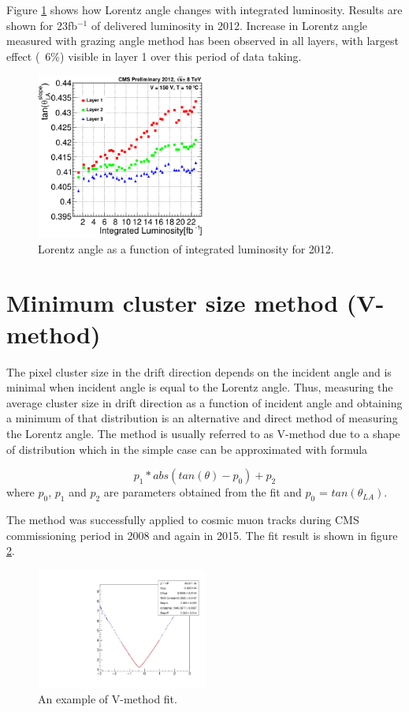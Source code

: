 Figure \ref{fig:La2012} shows how Lorentz angle changes with integrated luminosity. Results are shown for 23fb$^{-1}$ of delivered luminosity in 2012. Increase in Lorentz angle measured with grazing angle method has been observed in all layers, with largest effect (~6\%) visible in layer 1 over this period of data taking.  
\begin{figure}[ht!]
\centering
\includegraphics[width=0.5\textwidth]{Figures/LA2012.png}
\caption{Lorentz angle as a function of integrated luminosity for 2012.}
\label{fig:La2012}
\end{figure}

\section{Minimum cluster size method (V-method)}
The pixel cluster size in the drift direction depends on the incident
angle and is minimal when incident angle is equal to the Lorentz angle. Thus, measuring the average cluster size in drift direction as a function of incident angle and obtaining a minimum of that
distribution is an alternative and direct method of measuring the Lorentz angle. The method is usually referred to as V-method due
to a shape of distribution which in the simple case can be approximated with formula

\begin{equation}
p_1*abs(tan(\theta) - p_0) + p_2
\end{equation}
where $p_0$, $p_1$ and $p_2$ are parameters obtained from the fit and $p_0$ = $tan(\theta_{LA})$.

The method was successfully applied to cosmic muon tracks during CMS commissioning period in 2008 and again in 2015. The fit result is shown in figure \ref{fig:LA_VMethod}.

\begin{figure}[hbtp!]
	\centering
	\includegraphics[width=0.5\textwidth]{Figures/LA_VMethod_2015.pdf}
	\caption{An example of V-method fit.}
	\label{fig:LA_VMethod}
\end{figure}

